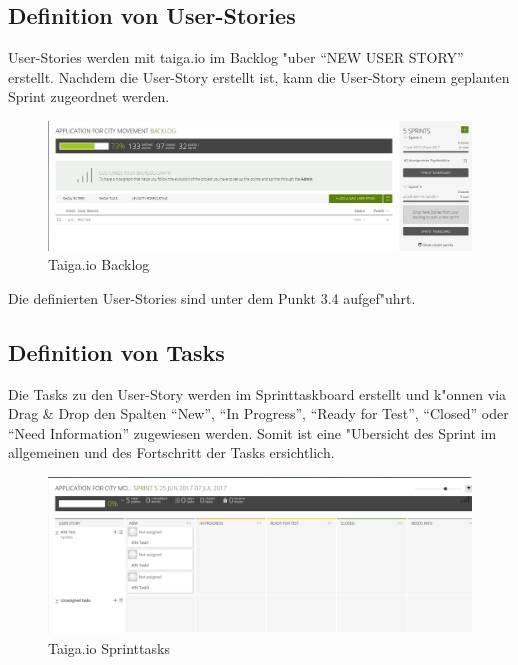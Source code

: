 \documentclass[a4paper, 11pt]{scrreprt}
\begin{document}
\subsection{Definition von User-Stories}

User-Stories werden mit taiga.io im Backlog "uber "`NEW USER STORY"' erstellt. Nachdem die User-Story erstellt ist, kann die User-Story einem geplanten Sprint zugeordnet werden.

\begin{figure} [H]
\begin{center}

\includegraphics[width=16cm]{backlog.png}
\caption{Taiga.io Backlog}

\end{center}
\end{figure}

Die definierten User-Stories sind unter dem Punkt 3.4 aufgef"uhrt.


\subsection{Definition von Tasks}

Die Tasks zu den User-Story werden im Sprinttaskboard erstellt und k"onnen via Drag \& Drop den Spalten "`New"', "`In Progress"', "`Ready for Test"', "`Closed"' oder "`Need Information"' zugewiesen werden. Somit ist eine "Ubersicht des Sprint im allgemeinen und des Fortschritt der Tasks ersichtlich.

\begin{figure} [H]
\begin{center}

\includegraphics[width=16cm]{sprint_tasks.png}
\caption{Taiga.io Sprinttasks}

\end{center}
\end{figure}
\end{document}

